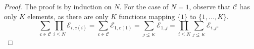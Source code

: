 \begin{proof}

%

The proof is by induction on $N$. For the case of $N = 1$, observe that $\mathcal{C}$ has only $K$ elements, as there are only $K$ functions mapping $\{1\}$ to $\{1, \ldots, K\}$.
%
\begin{equation}
\sum_{c \in \mathcal{C}} \prod_{i \leq N} \mathcal{E}_{i, c(i)} = \sum_{c \in \mathcal{C}} \mathcal{E}_{1, c(1)} = \sum_{j \leq K} \mathcal{E}_{1,j} = \prod_{i \leq N}\sum_{j \leq K} \mathcal{E}_{i,j}.
\end{equation}


\end{proof}
